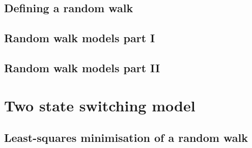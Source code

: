 \documentclass[../full_thesis/full_thesis.tex]{subfiles}
\newcommand{\thisdir}{../analytic_timing_noise_cgw}
\begin{document}
\subsection{Defining a random walk}
\label{sec: Defining a random walk}


\subsection{Random walk models part I}
\label{sec: Random walk models part I}


\subsection{Random walk models part II} 
\label{sec: Random walk models part II}


\section{Two state switching model}
\label{sec: Two state switching model}



\begin{subappendices}
    

\section{Least-squares minimisation of a random walk}
\label{sec: least squares minimisation of a random walk}



\end{subappendices}


\biblio
\end{document}
